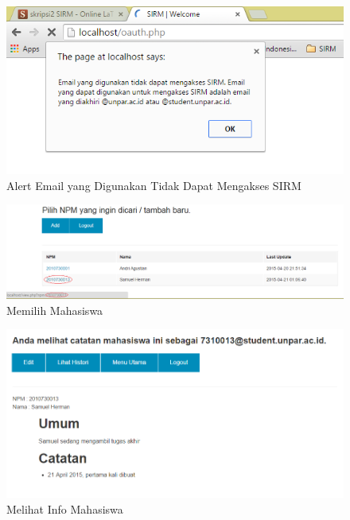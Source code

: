 \begin{figure}[H]
\centering
\includegraphics[scale=1]{Gambar/pengujian7.png}
\caption[Alert Email yang Digunakan Tidak Dapat Mengakses SIRM]{Alert Email yang Digunakan Tidak Dapat Mengakses SIRM} 
\label{fig:alert}
\end{figure}

\begin{figure}[H]
\centering
\includegraphics[scale=0.5]{Gambar/pengujian8.png}
\caption[Memilih Mahasiswa]{Memilih Mahasiswa} 
\label{fig:memilihmahasiswa}
\end{figure}

\begin{figure}[H]
\centering
\includegraphics[scale=0.6]{Gambar/pengujian9.png}
\caption[Melihat Info Mahasiswa]{Melihat Info Mahasiswa} 
\label{fig:melihatinfomahasiswa}
\end{figure}

